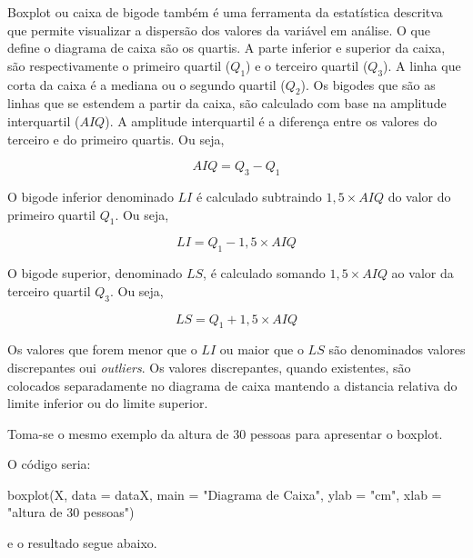 \documentclass[
]{book}
\newenvironment{Shaded}{\begin{snugshade}}{\end{snugshade}}
\newcommand{\AttributeTok}[1]{\textcolor[rgb]{0.77,0.63,0.00}{#1}}
\newcommand{\FunctionTok}[1]{\textcolor[rgb]{0.00,0.00,0.00}{#1}}
\newcommand{\NormalTok}[1]{#1}
\newcommand{\StringTok}[1]{\textcolor[rgb]{0.31,0.60,0.02}{#1}}
\begin{document}
Boxplot ou caixa de bigode também é uma ferramenta da estatística descritva que permite visualizar a dispersão dos valores da variável em análise. O que define o diagrama de caixa são os quartis. A parte inferior e superior da caixa, são respectivamente o primeiro quartil (\(Q_1\)) e o terceiro quartil (\(Q_3\)). A linha que corta da caixa é a mediana ou o segundo quartil (\(Q_2\)). Os bigodes que são as linhas que se estendem a partir da caixa, são calculado com base na amplitude interquartil (\(AIQ\)). A amplitude interquartil é a diferença entre os valores do terceiro e do primeiro quartis. Ou seja,

\begin{equation*}
  AIQ = Q_3 - Q_1
\end{equation*}

O bigode inferior denominado \(LI\) é calculado subtraindo \(1,5\times AIQ\) do valor do primeiro quartil \(Q_1\). Ou seja,

\begin{equation*}
  LI = Q_1 - 1,5 \times AIQ
\end{equation*}

O bigode superior, denominado \(LS\), é calculado somando \(1,5\times AIQ\) ao valor da terceiro quartil \(Q_3\). Ou seja,

\begin{equation*}
  LS = Q_1 + 1,5 \times AIQ
\end{equation*}

Os valores que forem menor que o \(LI\) ou maior que o \(LS\) são denominados valores discrepantes oui \emph{outliers}. Os valores discrepantes, quando existentes, são colocados separadamente no diagrama de caixa mantendo a distancia relativa do limite inferior ou do limite superior.

Toma-se o mesmo exemplo da altura de 30 pessoas para apresentar o boxplot.

O código seria:

\begin{Shaded}
\begin{Highlighting}[]
\FunctionTok{boxplot}\NormalTok{(X, }\AttributeTok{data =}\NormalTok{ dataX, }\AttributeTok{main =} \StringTok{"Diagrama de Caixa"}\NormalTok{, }
    \AttributeTok{ylab =} \StringTok{"cm"}\NormalTok{, }\AttributeTok{xlab =} \StringTok{"altura de 30 pessoas"}\NormalTok{)}
\end{Highlighting}
\end{Shaded}

e o resultado segue abaixo.
\end{document}
